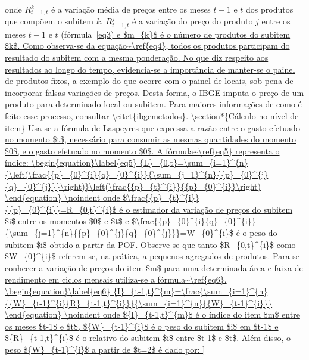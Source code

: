 \noindent onde ${R}_{t-1,t}^{k}$ é a variação média de preços entre os meses $t-1$ e $t$ dos produtos que compõem o subitem $k$, ${R}_{t-1,t}^{j}$ é a variação do preço do produto $j$ entre os meses $t-1$ e $t$ (fórmula~\ref{eq3) e $m_{k}$ é o número de produtos do subitem $k$. Como observa-se da equação~\ref{eq4}, todos os produtos participam do resultado do subitem com a mesma ponderação.

No que diz respeito aos resultados ao longo do tempo, evidencia-se a importância de manter-se o painel de produtos fixos, a exemplo do que ocorre com o painel de locais, sob pena de incorporar falsas variações de preços. Desta forma, o IBGE imputa o preço de um produto para determinado local ou subitem. Para maiores informações de como é feito esse processo, consultar \citet{ibgemetodos}.

\section*{Cálculo no nível de item}

Usa-se a fórmula de Laspeyres que expressa a razão entre o gasto efetuado no momento $t$, necessário para consumir as mesmas quantidades do momento $0$, e o gasto efetuado no momento $0$. A fórmula~\ref{eq5} representa o índice:

\begin{equation}\label{eq5}
{L}_{0,t}=\sum_{i=1}^{n}{\left(\frac{{p}_{0}^{i}{q}_{0}^{i}}{\sum_{j=1}^{n}{{p}_{0}^{j}{q}_{0}^{j}}}\right)}\left(\frac{{p}_{t}^{i}}{{p}_{0}^{i}}\right) 
\end{equation}

\noindent onde $\frac{{p}_{t}^{i}}{{p}_{0}^{i}}=R_{0,t}^{i}$ é o estimador da variação de preços do subitem $i$ entre os momentos $0$ e $t$ e $\frac{{p}_{0}^{i}{q}_{0}^{i}}{\sum_{j=1}^{n}{{p}_{0}^{j}{q}_{0}^{j}}}=W_{0}^{i}$ é o peso do subitem $i$ obtido a partir da POF. Observe-se que tanto $R_{0,t}^{i}$ como $W_{0}^{i}$ referem-se, na prática, a pequenos agregados de produtos. Para se conhecer a variação de preços do item $m$ para uma determinada área e faixa de rendimento em ciclos mensais utiliza-se a fórmula~\ref{eq6}.

\begin{equation}\label{eq6}
{I}_{t-1,t}^{m}=\frac{\sum_{i=1}^{n}{{W}_{t-1}^{i}{R}_{t-1,t}^{i}}}{\sum_{i=1}^{n}{{W}_{t-1}^{i}}} 
\end{equation}

\noindent onde ${I}_{t-1,t}^{m}$ é o índice do item $m$ entre os meses $t-1$ e $t$, ${W}_{t-1}^{i}$ é o peso do subitem $i$ em $t-1$ e ${R}_{t-1,t}^{i}$ é o relativo do subitem $i$ entre $t-1$ e $t$. Além disso, o peso ${W}_{t-1}^{i}$ a partir de $t=2$ é dado por:

}
